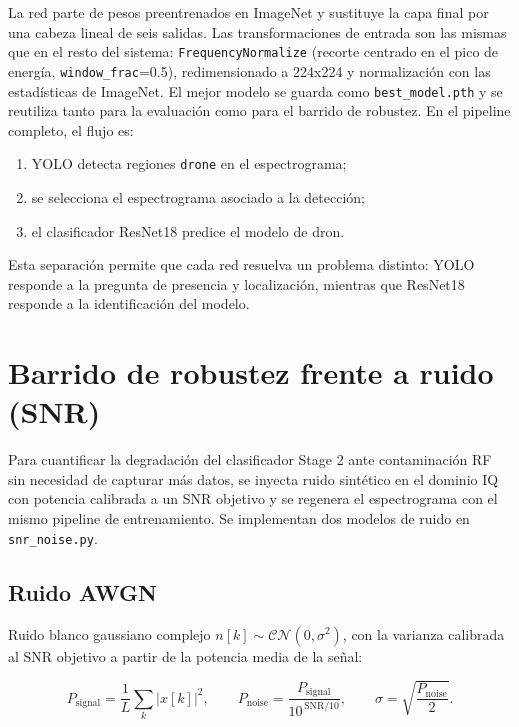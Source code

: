 La red parte de pesos preentrenados en ImageNet y sustituye la capa final por una cabeza lineal de seis salidas. Las transformaciones de entrada son las mismas que en el resto del sistema: \texttt{FrequencyNormalize} (recorte centrado en el pico de energía, \texttt{window\_frac}=\num{0.5}), redimensionado a \num{224}x\num{224} y normalización con las estadísticas de ImageNet. El mejor modelo se guarda como \texttt{best\_model.pth} y se reutiliza tanto para la evaluación como para el barrido de robustez. En el pipeline completo, el flujo es:

\begin{enumerate}
  \item YOLO detecta regiones \texttt{drone} en el espectrograma;
  \item se selecciona el espectrograma asociado a la detección;
  \item el clasificador ResNet18 predice el modelo de dron.
\end{enumerate}

Esta separación permite que cada red resuelva un problema distinto: YOLO responde a la pregunta de presencia y localización, mientras que ResNet18 responde a la identificación del modelo.

\section{Barrido de robustez frente a ruido (SNR)}
\label{sec:implementacion_snr}

Para cuantificar la degradación del clasificador Stage 2 ante contaminación RF sin necesidad de capturar más datos, se inyecta ruido sintético en el dominio IQ con potencia calibrada a un SNR objetivo y se regenera el espectrograma con el mismo pipeline de entrenamiento. Se implementan dos modelos de ruido en \texttt{snr\_noise.py}.

\subsection{Ruido AWGN}

Ruido blanco gaussiano complejo $n[k] \sim \mathcal{CN}(0, \sigma^2)$, con la varianza calibrada al SNR objetivo a partir de la potencia media de la señal:

\begin{equation}
P_{\mathrm{signal}} = \frac{1}{L}\sum_k |x[k]|^2, \qquad
P_{\mathrm{noise}} = \frac{P_{\mathrm{signal}}}{10^{\,\mathrm{SNR}/10}}, \qquad
\sigma = \sqrt{\frac{P_{\mathrm{noise}}}{2}}.
\end{equation}


